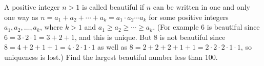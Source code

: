 A positive integer $n>1$ is called beautiful if $n$ can be written in one and only one way as $n=a_1+a_2+\cdots+a_k=a_1 \cdot a_2 \cdots a_k$ for some positive integers $a_1, a_2, \ldots, a_k$, where $k>1$ and $a_1 \geq a_2 \geq \cdots \geq a_k$. (For example 6 is beautiful since $6=3 \cdot 2 \cdot 1=3+2+1$, and this is unique. But 8 is not beautiful since $8=4+2+1+1=4 \cdot 2 \cdot 1 \cdot 1$ as well as $8=2+2+2+1+1=2 \cdot 2 \cdot 2 \cdot 1 \cdot 1$, so uniqueness is lost.) Find the largest beautiful number less than 100.
